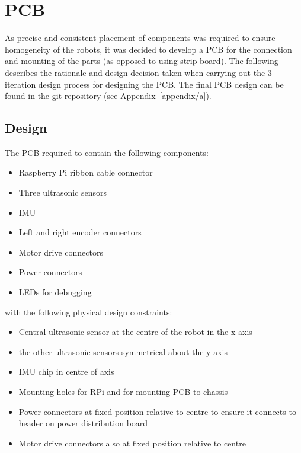 \section{PCB}\label{elec/pcb}
As precise and consistent placement of components was required to ensure homogeneity of the robots, it was decided to develop a PCB for the connection and mounting of the parts (as opposed to using strip board). The following describes the rationale and design decision taken when carrying out the 3-iteration design process for designing the PCB. The final PCB design can be found in the git repository (see Appendix~\ref{appendix/a}).

\subsection{Design}\label{elec/pcb/design}
The PCB required to contain the following components:
\begin{itemize}
  \item Raspberry Pi ribbon cable connector
  \item Three ultrasonic sensors
  \item IMU
  \item Left and right encoder connectors
  \item Motor drive connectors
  \item Power connectors
  \item LEDs for debugging
\end{itemize}

with the following physical design constraints:

\begin{itemize}
  \item Central ultrasonic sensor at the centre of the robot in the x axis
  \item the other ultrasonic sensors symmetrical about the y axis
  \item IMU chip in centre of axis
  \item Mounting holes for RPi and for mounting PCB to chassis
  \item Power connectors at fixed position relative to centre to ensure it connects to header on power distribution board
  \item Motor drive connectors also at fixed position relative to centre
\end{itemize}

